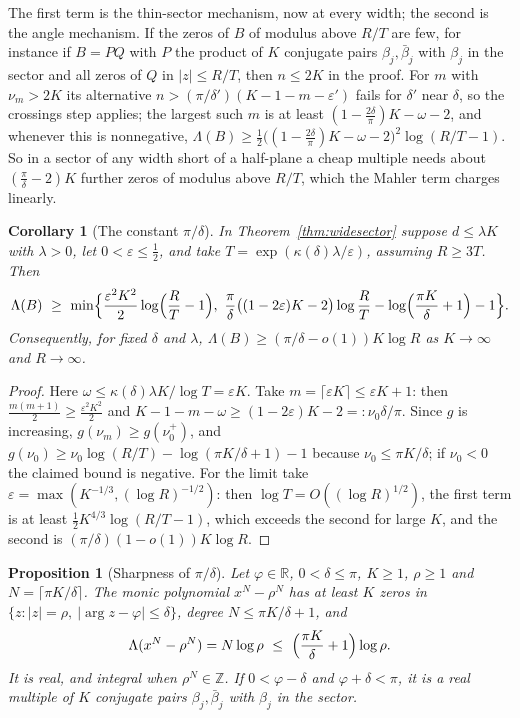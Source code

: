 \documentclass[11pt]{article}
\newtheorem{corollary}[theorem]{Corollary}
\newtheorem{proposition}[theorem]{Proposition}
\newcommand{\R}{\mathbb R}
\begin{document}
The first term is the thin-sector mechanism, now at every width; the second
is the angle mechanism.  If the zeros of $B$ of modulus above $R/T$ are few,
for instance if $B=PQ$ with $P$ the product of $K$ conjugate pairs
$\beta_j,\bar\beta_j$ with $\beta_j$ in the sector and all zeros of $Q$ in $|z|\le R/T$, then $n\le2K$ in the proof.
For $m$ with $\nu_m>2K$ its alternative $n>(\pi/\delta')(K-1-m-\varepsilon')$
fails for $\delta'$ near $\delta$, so the crossings step applies; the largest
such $m$ is at least $(1-\frac{2\delta}\pi)K-\omega-2$, and whenever this is
nonnegative,
$\Lambda(B)\ge\frac12\bigl((1-\frac{2\delta}\pi)K-\omega-2\bigr)^2\log(R/T-1)$.
So in a sector of any
width short of a half-plane a cheap multiple needs about
$(\frac\pi\delta-2)K$ further zeros of modulus above $R/T$, which the
Mahler term charges linearly.

\begin{corollary}[The constant $\pi/\delta$]\label{cor:wideconst}
In Theorem~\ref{thm:widesector} suppose $d\le\lambda K$ with $\lambda>0$, let
$0<\varepsilon\le\frac12$, and take $T=\exp(\kappa(\delta)\lambda/\varepsilon)$,
assuming $R\ge3T$.  Then
\[
  \Lambda(B)\ \ge\ \min\Bigl\{\frac{\varepsilon^2K^2}2\log\Bigl(\frac RT-1\Bigr),\
  \frac\pi\delta\bigl((1-2\varepsilon)K-2\bigr)\log\frac RT
  -\log\Bigl(\frac{\pi K}\delta+1\Bigr)-1\Bigr\}.
\]
Consequently, for fixed $\delta$ and $\lambda$,
$\Lambda(B)\ge(\pi/\delta-o(1))K\log R$ as $K\to\infty$ and $R\to\infty$.
\end{corollary}

\begin{proof}
Here $\omega\le\kappa(\delta)\lambda K/\log T=\varepsilon K$.  Take
$m=\lceil\varepsilon K\rceil\le\varepsilon K+1$: then
$\frac{m(m+1)}2\ge\frac{\varepsilon^2K^2}2$ and
$K-1-m-\omega\ge(1-2\varepsilon)K-2=:\nu_0\delta/\pi$.  Since $g$ is increasing,
$g(\nu_m)\ge g(\nu_0^+)$, and $g(\nu_0)\ge\nu_0\log(R/T)-\log(\pi K/\delta+1)-1$
because $\nu_0\le\pi K/\delta$; if $\nu_0<0$ the claimed bound is negative.
For the limit take $\varepsilon=\max(K^{-1/3},(\log R)^{-1/2})$: then
$\log T=O((\log R)^{1/2})$, the first term is at least
$\frac12K^{4/3}\log(R/T-1)$, which exceeds the second for large $K$, and the second is
$(\pi/\delta)(1-o(1))K\log R$.
\end{proof}

\begin{proposition}[Sharpness of $\pi/\delta$]\label{prop:widesharp}
Let $\varphi\in\R$, $0<\delta\le\pi$, $K\ge1$, $\rho\ge1$ and
$N=\lceil\pi K/\delta\rceil$.  The monic polynomial $x^N-\rho^N$ has at least
$K$ zeros in $\{z:|z|=\rho,\ |\arg z-\varphi|\le\delta\}$, degree
$N\le\pi K/\delta+1$, and
\[
  \Lambda(x^N-\rho^N)=N\log\rho\ \le\ \Bigl(\frac{\pi K}\delta+1\Bigr)\log\rho .
\]
It is real, and integral when $\rho^N\in\mathbb Z$.  If $0<\varphi-\delta$
and $\varphi+\delta<\pi$, it is a real multiple of $K$ conjugate pairs
$\beta_j,\bar\beta_j$ with $\beta_j$ in the sector.
\end{proposition}
\end{document}

